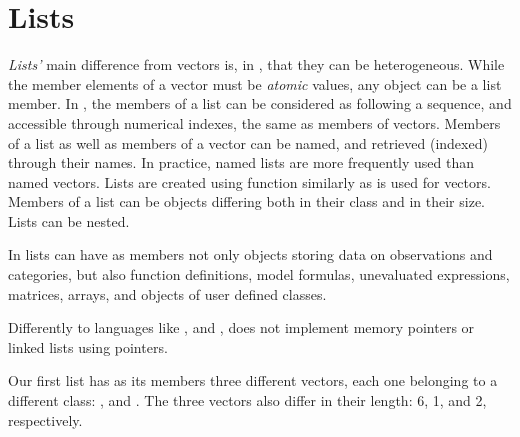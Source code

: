 \documentclass[krantz2]{krantz}\usepackage{knitr}
\begin{document}
\section{Lists}\label{sec:calc:lists}
\emph{Lists'} main difference from vectors is, in \Rlang, that they can be heterogeneous. While the member elements of a vector must be \emph{atomic} values, any \Rlang object can be a list member. In \Rlang, the members of a list can be considered as following a sequence, and accessible through numerical indexes, the same as members of vectors. Members of a list as well as members of a vector can be named, and retrieved (indexed) through their names. In practice, named lists are more frequently used than named vectors. Lists are created using function  similarly as  is used for vectors. Members of a list can be objects differing both in their class and in their size. Lists can be nested.

\begin{explainbox}
  In \Rlang lists can have as members not only objects storing data on observations and categories, but also function definitions, model formulas, unevaluated expressions, matrices, arrays, and objects of user defined classes.

  Differently to languages like \Clang, \Cpplang and \pascallang, \Rlang does not implement memory pointers or linked lists using pointers.
\end{explainbox}

Our first list has as its members three different vectors, each one belonging to a different class: ,  and . The three vectors also differ in their length: 6, 1, and 2, respectively.

\begin{knitrout}\footnotesize
{}\color{fgcolor}\begin{kframe}
\begin{alltt}
 \hlkwb{<-} \hlstd{(} \hlstd{=} \hlopt{:}\hlstd{,}  \hlstd{=} \hlstd{,}  \hlstd{=} \hlstd{(}\hlstd{,} \hlstd{))}
\end{alltt}
\end{kframe}
\end{knitrout}
\end{document}
